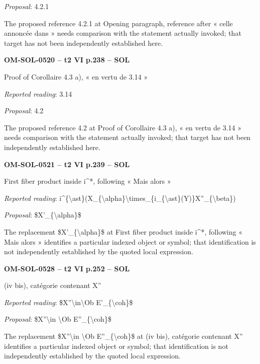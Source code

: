 \emph{Proposal}: 4.2.1\par
The proposed reference 4.2.1 at Opening paragraph, reference after « celle annoncée dans » needs comparison with the statement actually invoked; that target has not been independently established here.\par
\par\noindent\textbf{OM-SOL-0520 -- t2 VI p.238 -- SOL}\par
Proof of Corollaire 4.3 a), « en vertu de 3.14 »\par
\emph{Reported reading}: 3.14\par
\emph{Proposal}: 4.2\par
The proposed reference 4.2 at Proof of Corollaire 4.3 a), « en vertu de 3.14 » needs comparison with the statement actually invoked; that target has not been independently established here.\par
\par\noindent\textbf{OM-SOL-0521 -- t2 VI p.239 -- SOL}\par
First fiber product inside i\textasciicircum{}*, following « Mais alors »\par
\emph{Reported reading}: i\textasciicircum{}\{\textbackslash{}ast\}(X\_\{\textbackslash{}alpha\}\textbackslash{}times\_\{i\_\{\textbackslash{}ast\}(Y)\}X''\_\{\textbackslash{}beta\})\par
\emph{Proposal}: \$X'\_\{\textbackslash{}alpha\}\$\par
The replacement \$X'\_\{\textbackslash{}alpha\}\$ at First fiber product inside i\textasciicircum{}*, following « Mais alors » identifies a particular indexed object or symbol; that identification is not independently established by the quoted local expression.\par
\par\noindent\textbf{OM-SOL-0528 -- t2 VI p.252 -- SOL}\par
(iv bis), catégorie contenant X''\par
\emph{Reported reading}: \$X''\textbackslash{}in\textbackslash{}Ob E'\_\{\textbackslash{}coh\}\$\par
\emph{Proposal}: \$X''\textbackslash{}in \textbackslash{}Ob E''\_\{\textbackslash{}coh\}\$\par
The replacement \$X''\textbackslash{}in \textbackslash{}Ob E''\_\{\textbackslash{}coh\}\$ at (iv bis), catégorie contenant X'' identifies a particular indexed object or symbol; that identification is not independently established by the quoted local expression.\par
